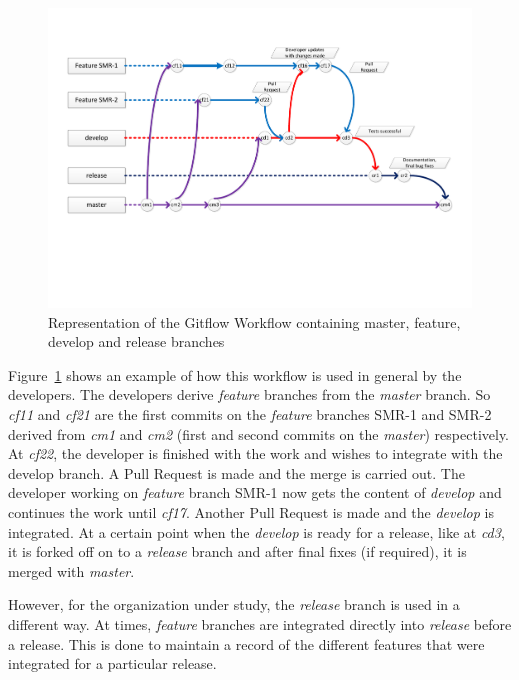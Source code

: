\documentclass[12pt, a4paper, titlepage]{scrartcl}
\newcommand{\courierword}[1]{\textsf{\itshape #1}}{\fontfamily{pcr}\selectfont}%
\begin{document}
\begin{figure}[!ht]
\includegraphics[clip, trim=0cm 5cm 0cm 0cm, width=\textwidth]{Gitflow-Workflow.pdf}
\caption{Representation of the Gitflow Workflow containing master, feature, develop and release branches}
\label{fig:Gitflow-workflow}
\end{figure}%

\par Figure~\ref{fig:Gitflow-workflow} shows an example of how this workflow is used in general by the developers. The developers derive \courierword{feature} branches from the \courierword{master} branch. So \textit{cf11} and \textit{cf21} are the first commits on the \courierword{feature} branches SMR-1 and SMR-2 derived from \textit{cm1} and \textit{cm2} (first and second commits on the \courierword{master}) respectively. At \textit{cf22}, the developer is finished with the work and wishes to integrate with the develop branch. A Pull Request is made and the merge is carried out. The developer working on \courierword{feature} branch SMR-1 now gets the content of \courierword{develop} and continues the work until \textit{cf17}. Another Pull Request is made and the \courierword{develop} is integrated. At a certain point when the \courierword{develop} is ready for a release, like at \textit{cd3}, it is forked off on to a \courierword{release} branch and after final fixes (if required), it is merged with \courierword{master}. 
\par However, for the organization under study, the \courierword{release} branch is used in a different way. At times, \courierword{feature} branches are integrated directly into \courierword{release} before a release. This is done to maintain a record of the different features that were integrated for a particular release. 
\end{document}
